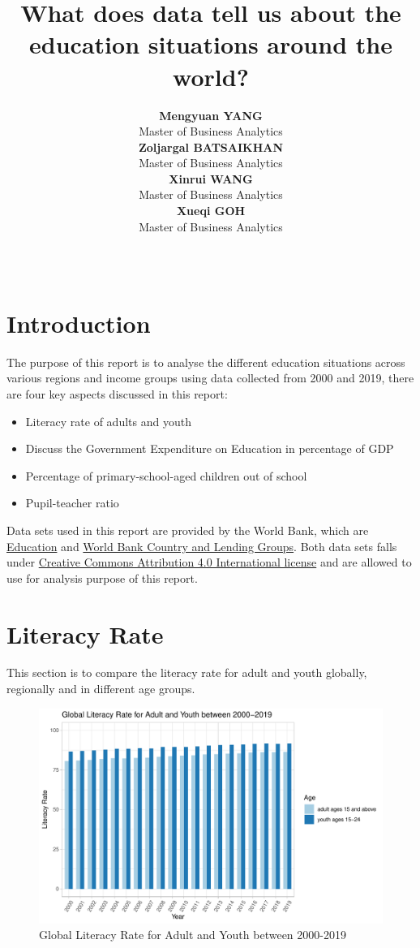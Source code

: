 \documentclass[11pt,a4paper,]{article}
\title{What does data tell us about the education situations around the world?}
\author{\sf\Large\textbf{ Mengyuan YANG}\\ {\sf\large Master of Business Analytics\\[0.5cm]} \sf\Large\textbf{ Zoljargal BATSAIKHAN}\\ {\sf\large Master of Business Analytics\\[0.5cm]} \sf\Large\textbf{ Xinrui WANG}\\ {\sf\large Master of Business Analytics\\[0.5cm]} \sf\Large\textbf{ Xueqi GOH}\\ {\sf\large Master of Business Analytics\\[0.5cm]}}
\date{\sf\Date~\Month~\Year}
\makeatletter
\providecommand{\tightlist}{%
  \setlength{\itemsep}{0pt}\setlength{\parskip}{0pt}}
\def\titlepage{\front{\expandafter{\@title}}{\@author}{\@organization}}
\makeatother
\begin{document}
\titlepage

\section*{Introduction}

The purpose of this report is to analyse the different education situations across various regions and income groups using data collected from 2000 and 2019, there are four key aspects discussed in this report:

\begin{itemize}
\tightlist
\item
  Literacy rate of adults and youth
\item
  Discuss the Government Expenditure on Education in percentage of GDP
\item
  Percentage of primary-school-aged children out of school
\item
  Pupil-teacher ratio
\end{itemize}

Data sets used in this report are provided by the World Bank, which are \href{https://data.worldbank.org/topic/education?end=2018\&start=1998\&view=chart}{Education} and \href{https://datahelpdesk.worldbank.org/knowledgebase/articles/906519-world-bank-country-and-lending-groups}{World Bank Country and Lending Groups}. Both data sets falls under \href{https://datacatalog.worldbank.org/public-licenses}{Creative Commons Attribution 4.0 International license} and are allowed to use for analysis purpose of this report.
\clearpage

\section*{Literacy Rate}

This section is to compare the literacy rate for adult and youth globally, regionally and in different age groups.

\begin{figure}
\centering
\includegraphics{report_files/figure-latex/world-my-1.pdf}
\caption{\label{fig:world-my}Global Literacy Rate for Adult and Youth between 2000-2019}
\end{figure}
\end{document}

